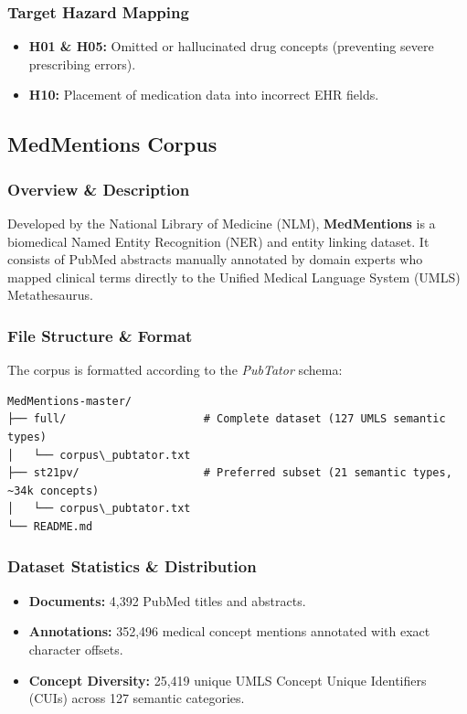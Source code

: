 \subsubsection*{Target Hazard Mapping}
\begin{itemize}
    \item \textbf{H01 \& H05:} Omitted or hallucinated drug concepts (preventing severe prescribing errors).
    \item \textbf{H10:} Placement of medication data into incorrect EHR fields.
\end{itemize}

\subsection{MedMentions Corpus}
\label{subsec:medmentions}

\subsubsection*{Overview \& Description}
Developed by the National Library of Medicine (NLM), \textbf{MedMentions} is a biomedical Named Entity Recognition (NER) and entity linking dataset. It consists of PubMed abstracts manually annotated by domain experts who mapped clinical terms directly to the Unified Medical Language System (UMLS) Metathesaurus.

\subsubsection*{File Structure \& Format}
The corpus is formatted according to the \textit{PubTator} schema:
\begin{verbatim}
MedMentions-master/
├── full/                     # Complete dataset (127 UMLS semantic types)
│   └── corpus\_pubtator.txt
├── st21pv/                   # Preferred subset (21 semantic types, ~34k concepts)
│   └── corpus\_pubtator.txt
└── README.md
\end{verbatim}

\subsubsection*{Dataset Statistics \& Distribution}
\begin{itemize}
    \item \textbf{Documents:} 4,392 PubMed titles and abstracts.
    \item \textbf{Annotations:} 352,496 medical concept mentions annotated with exact character offsets.
    \item \textbf{Concept Diversity:} 25,419 unique UMLS Concept Unique Identifiers (CUIs) across 127 semantic categories.
\end{itemize}


